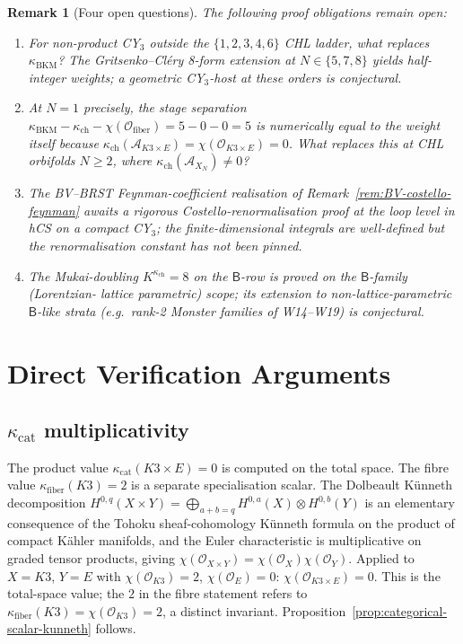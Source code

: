 \documentclass[11pt]{article}
\newtheorem{remark}[theorem]{Remark}
\newcommand{\cO}{\mathcal{O}}
\newcommand{\cA}{\mathcal{A}}
\begin{document}
\begin{remark}[Four open questions]
\label{rem:open-questions}
The following proof obligations remain open:
\begin{enumerate}
\item For non-product CY$_3$ outside the $\{1,2,3,4,6\}$ CHL ladder,
what replaces $\kappa_{\mathrm{BKM}}$? The
Gritsenko--Cl\'ery 8-form extension at $N\in\{5,7,8\}$ yields
half-integer weights; a geometric CY$_3$-host at these orders is
conjectural.
\item At $N=1$ precisely, the stage separation
$\kappa_{\mathrm{BKM}}-\kappa_{\mathrm{ch}}-\chi(\cO_{\mathrm{fiber}})
=5-0-0=5$ is numerically equal to the weight itself because
$\kappa_{\mathrm{ch}}(\cA_{K3\times E})=\chi(\cO_{K3\times E})=0$.
What replaces this at CHL orbifolds $N\geq 2$, where
$\kappa_{\mathrm{ch}}(\cA_{X_N})\neq 0$?
\item The BV--BRST Feynman-coefficient realisation of
Remark~\ref{rem:BV-costello-feynman} awaits a rigorous
Costello-renormalisation proof at the loop level in hCS on a compact
CY$_3$; the finite-dimensional integrals are well-defined but the
renormalisation constant has not been pinned.
\item The Mukai-doubling $K^{\kappa_{\mathrm{ch}}}=8$ on the
$\mathsf{B}$-row is proved \emph{on} the $\mathsf{B}$-family (Lorentzian-
lattice parametric) scope; its extension to
non-lattice-parametric $\mathsf{B}$-like strata (e.g.~rank-2 Monster
families of W14--W19) is conjectural.
\end{enumerate}
\end{remark}

\appendix

\section{Direct Verification Arguments}
\label{sec:verification-arguments}

\subsection*{$\kappa_{\mathrm{cat}}$ multiplicativity}
The product value $\kappa_{\mathrm{cat}}(K3\times E)=0$ is computed on
the total space. The fibre value
$\kappa_{\mathrm{fiber}}(K3)=2$ is a separate specialisation scalar.
The Dolbeault K\"unneth decomposition
$H^{0,q}(X\times Y)=\bigoplus_{a+b=q}H^{0,a}(X)\otimes H^{0,b}(Y)$
is an elementary consequence of the Tohoku sheaf-cohomology K\"unneth
formula on the product of compact K\"ahler manifolds, and the Euler
characteristic is multiplicative on graded tensor products, giving
$\chi(\cO_{X\times Y})=\chi(\cO_X)\chi(\cO_Y)$. Applied to
$X=K3$, $Y=E$ with $\chi(\cO_{K3})=2$, $\chi(\cO_E)=0$:
$\chi(\cO_{K3\times E})=0$. This is the total-space value; the
$2$ in the fibre statement
refers to $\kappa_{\mathrm{fiber}}(K3)=\chi(\cO_{K3})=2$, a distinct
invariant. Proposition~\ref{prop:categorical-scalar-kunneth} follows.
\end{document}
